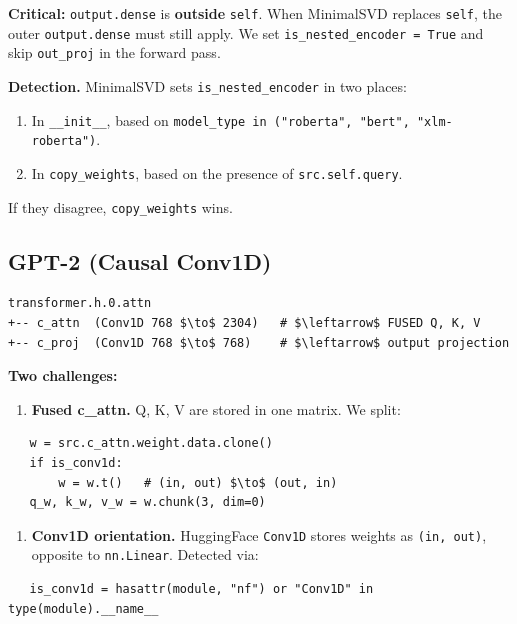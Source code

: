 \textbf{Critical:} \texttt{output.dense} is \textbf{outside} \texttt{self}. When MinimalSVD replaces 
\texttt{self}, the outer \texttt{output.dense} must still apply. We set 
\texttt{is\_nested\_encoder = True} and skip \texttt{out\_proj} in the forward pass.

\textbf{Detection.} MinimalSVD sets \texttt{is\_nested\_encoder} in two places:

\begin{enumerate}
\item In \texttt{\_\_init\_\_}, based on \texttt{model\_type in ("roberta", "bert", "xlm-roberta")}.
\item In \texttt{copy\_weights}, based on the presence of \texttt{src.self.query}.

\end{enumerate}
If they disagree, \texttt{copy\_weights} wins.

\subsection{GPT-2 (Causal Conv1D)}

\begin{lstlisting}
transformer.h.0.attn
+-- c_attn  (Conv1D 768 $\to$ 2304)   # $\leftarrow$ FUSED Q, K, V
+-- c_proj  (Conv1D 768 $\to$ 768)    # $\leftarrow$ output projection
\end{lstlisting}

\textbf{Two challenges:}

\begin{enumerate}
\item \textbf{Fused c\_attn.} Q, K, V are stored in one matrix. We split:
\end{enumerate}
\begin{lstlisting}
   w = src.c_attn.weight.data.clone()
   if is_conv1d:
       w = w.t()   # (in, out) $\to$ (out, in)
   q_w, k_w, v_w = w.chunk(3, dim=0)
\end{lstlisting}

\begin{enumerate}
\item \textbf{Conv1D orientation.} HuggingFace \texttt{Conv1D} stores weights as \texttt{(in, out)},
  opposite to \texttt{nn.Linear}. Detected via:
\end{enumerate}
\begin{lstlisting}
   is_conv1d = hasattr(module, "nf") or "Conv1D" in type(module).__name__
\end{lstlisting}

